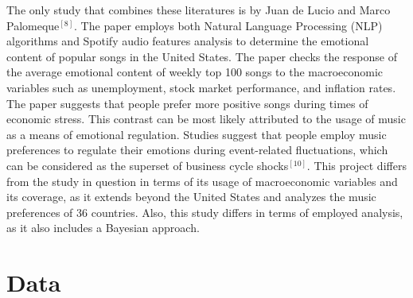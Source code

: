 \documentclass[12pt]{article}
\begin{document}
The only study that combines these literatures is by Juan de Lucio and Marco Palomeque$^{[8]}$. The paper employs both Natural Language Processing (NLP) algorithms and Spotify audio features analysis to determine the emotional content of popular songs in the United States. The paper checks the response of the average emotional content of weekly top 100 songs to the macroeconomic variables such as unemployment, stock market performance, and inflation rates. The paper suggests that people prefer more positive songs during times of economic stress. This contrast can be most likely attributed to the usage of music as a means of emotional regulation. Studies suggest that people employ music preferences to regulate their emotions during event-related fluctuations, which can be considered as the superset of business cycle shocks$^{[10]}$. This project differs from the study in question in terms of its usage of macroeconomic variables and its coverage, as it extends beyond the United States and analyzes the music preferences of 36 countries. Also, this study differs in terms of employed analysis, as it also includes a Bayesian approach.

\section{Data}
\end{document}
